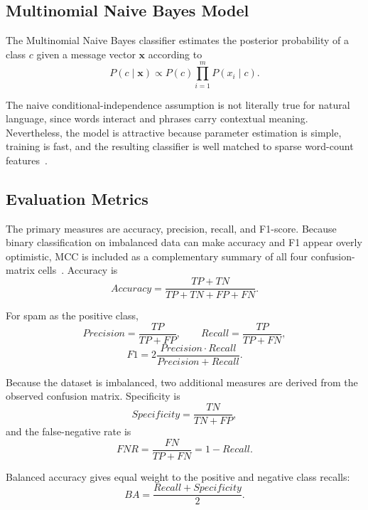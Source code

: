 \documentclass[conference]{IEEEtran}
\begin{document}
\subsection{Multinomial Naive Bayes Model}
The Multinomial Naive Bayes classifier estimates the posterior probability of a class $c$ given a message vector $\mathbf{x}$ according to
\begin{equation}
P(c\mid\mathbf{x})\propto P(c)\prod_{i=1}^{m}P(x_i\mid c).
\end{equation}

The naive conditional-independence assumption is not literally true for natural language, since words interact and phrases carry contextual meaning. Nevertheless, the model is attractive because parameter estimation is simple, training is fast, and the resulting classifier is well matched to sparse word-count features~\cite{mccallum1998nb}.

\subsection{Evaluation Metrics}
The primary measures are accuracy, precision, recall, and F1-score. Because binary classification on imbalanced data can make accuracy and F1 appear overly optimistic, MCC is included as a complementary summary of all four confusion-matrix cells~\cite{chicco2020mcc}. Accuracy is
\begin{equation}
Accuracy=\frac{TP+TN}{TP+TN+FP+FN}.
\end{equation}

For spam as the positive class,
\begin{equation}
Precision=\frac{TP}{TP+FP}, \qquad Recall=\frac{TP}{TP+FN},
\end{equation}
\begin{equation}
F1=2\frac{Precision\cdot Recall}{Precision+Recall}.
\end{equation}

Because the dataset is imbalanced, two additional measures are derived from the observed confusion matrix. Specificity is
\begin{equation}
Specificity=\frac{TN}{TN+FP},
\end{equation}
and the false-negative rate is
\begin{equation}
FNR=\frac{FN}{TP+FN}=1-Recall.
\end{equation}

Balanced accuracy gives equal weight to the positive and negative class recalls:
\begin{equation}
BA=\frac{Recall+Specificity}{2}.
\end{equation}
\end{document}
